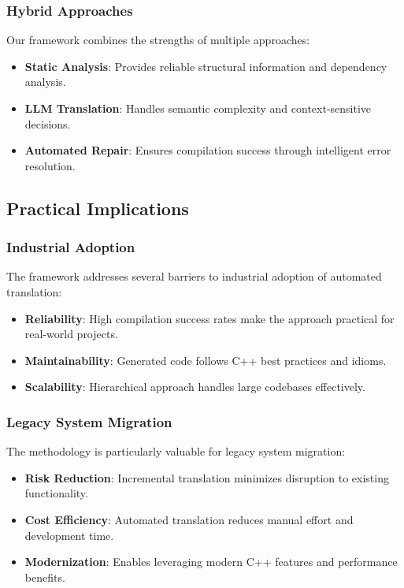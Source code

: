 \subsubsection{Hybrid Approaches}
Our framework combines the strengths of multiple approaches:

\begin{itemize}
\item \textbf{Static Analysis}: Provides reliable structural information and dependency analysis.
\item \textbf{LLM Translation}: Handles semantic complexity and context-sensitive decisions.
\item \textbf{Automated Repair}: Ensures compilation success through intelligent error resolution.
\end{itemize}

\subsection{Practical Implications}

\subsubsection{Industrial Adoption}
The framework addresses several barriers to industrial adoption of automated translation:

\begin{itemize}
\item \textbf{Reliability}: High compilation success rates make the approach practical for real-world projects.
\item \textbf{Maintainability}: Generated code follows C++ best practices and idioms.
\item \textbf{Scalability}: Hierarchical approach handles large codebases effectively.
\end{itemize}

\subsubsection{Legacy System Migration}
The methodology is particularly valuable for legacy system migration:

\begin{itemize}
\item \textbf{Risk Reduction}: Incremental translation minimizes disruption to existing functionality.
\item \textbf{Cost Efficiency}: Automated translation reduces manual effort and development time.
\item \textbf{Modernization}: Enables leveraging modern C++ features and performance benefits.
\end{itemize}

